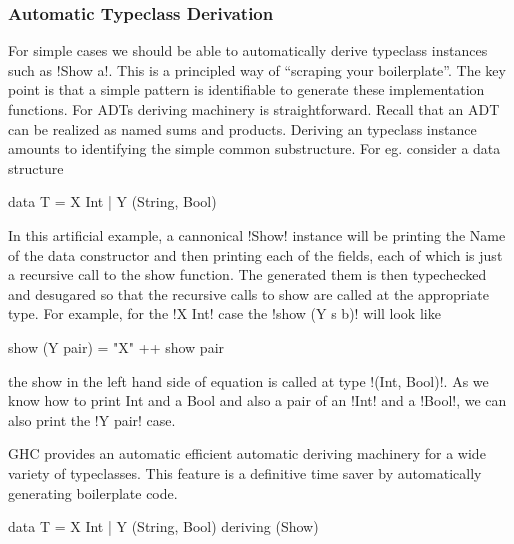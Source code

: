 \documentclass[screen,nonacm]{acmart}
\begin{document}
\subsubsection{Automatic Typeclass Derivation}
For simple cases we should be able to automatically derive typeclass
instances such as !Show a!. This is a principled way of ``scraping your
boilerplate''. The key point is that a simple pattern is identifiable
to generate these implementation functions. For ADTs deriving
machinery is straightforward. Recall that an ADT can be realized as
named sums and products. Deriving an typeclass instance amounts to
identifying the simple common substructure. For eg. consider a data
structure

\begin{CenteredBox}
\begin{code}
data T = X Int | Y (String, Bool)
\end{code}
\end{CenteredBox}

In this artificial example, a cannonical !Show! instance will be
printing the Name of the data constructor and then printing each of
the fields, each of which is just a recursive call to the show
function. The generated them is then typechecked and desugared so that
the recursive calls to show are called at the appropriate type.
For example, for the !X Int! case the !show (Y s b)! will look like

\begin{CenteredBox}
\begin{code}
show (Y pair) = "X" ++ show pair
\end{code}
\end{CenteredBox}

the show in the left hand side of equation is called at type
!(Int, Bool)!. As we know how to print Int and a Bool and also a pair of an
!Int! and a !Bool!, we can also print the !Y pair! case.

GHC provides an automatic efficient automatic deriving machinery
for a wide variety of typeclasses. This feature is a definitive time
saver by automatically generating boilerplate code.

\begin{CenteredBox}
\begin{code}
data T = X Int | Y (String, Bool)
                deriving (Show)
\end{code}
\end{CenteredBox}
\end{document}
